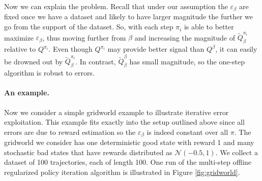 Now we can explain the problem. Recall that under our assumption the $ \varepsilon_\beta $ are fixed once we have a dataset and likely to have larger magnitude the further we go from the support of the dataset. So, with each step $ \pi_i$ is able to better maximize $ \varepsilon_\beta$, thus moving further from $ \beta$ and increasing the magnitude of $ \widetilde Q^{\pi_i}_\beta$ relative to $ Q^{\pi_i}$. Even though $ Q^{\pi_i}$ may provide better signal than $ Q^\beta$, it can easily be drowned out by $ \widetilde Q^{\pi_i}_\beta$. In contrast, $ \widetilde Q_\beta^\beta$ has small magnitude, so the one-step algorithm is robust to errors.

\paragraph{An example.} Now we consider a simple gridworld example to illustrate iterative error exploitation. This example fits exactly into the setup outlined above since all errors are due to reward estimation so the $ \varepsilon_\beta$ is indeed constant over all $ \pi$. The gridworld we consider has one deterministic good state with reward 1 and many stochastic bad states that have rewards distributed as $ \mathcal{N}(-0.5, 1)$. We collect a dataset of 100 trajectories, each of length 100. One run of the multi-step offline regularized policy iteration algorithm is illustrated in Figure \ref{fig:gridworld}.

